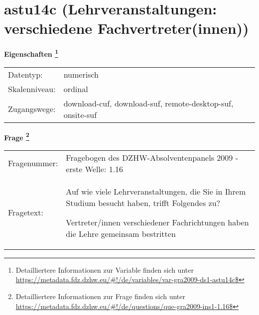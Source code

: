 
    \setcounter{footnote}{0}

    \vspace*{-1.8cm}
	\section{astu14c (Lehrveranstaltungen: verschiedene Fachvertreter(innen))}
	\label{section:astu14c}



    \vspace*{0.5cm}
    \noindent\textbf{Eigenschaften
	\footnote{Detailliertere Informationen zur Variable finden sich unter
		\url{https://metadata.fdz.dzhw.eu/\#!/de/variables/var-gra2009-ds1-astu14c$}}}\\
	\begin{tabularx}{\hsize}{@{}lX}
	Datentyp: & numerisch \\
	Skalenniveau: & ordinal \\
	Zugangswege: &
	  download-cuf, 
	  download-suf, 
	  remote-desktop-suf, 
	  onsite-suf
 \\
    \end{tabularx}



				\vspace*{0.5cm}
                \noindent\textbf{Frage
	                \footnote{Detailliertere Informationen zur Frage finden sich unter
		              \url{https://metadata.fdz.dzhw.eu/\#!/de/questions/que-gra2009-ins1-1.16$}}}\\
				\begin{tabularx}{\hsize}{@{}lX}
					Fragenummer: &
					  Fragebogen des DZHW-Absolventenpanels 2009 - erste Welle:
					  1.16
 \\
					Fragetext: & Auf wie viele Lehrveranstaltungen, die Sie in Ihrem Studium besucht haben, trifft Folgendes zu?\par  Vertreter/innen verschiedener Fachrichtungen haben die Lehre gemeinsam bestritten \\
				\end{tabularx}





